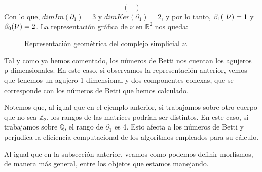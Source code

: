 \documentclass[12pt, a4paper]{article}
\numberwithin{equation}{section}
\theoremstyle{definition}
\newenvironment{ejem}
  {\pushQED{\qed}\renewcommand{\qedsymbol}{$\blacktriangleleft$}\ejemplo}
  {\popQED\endejemplo}
\theoremstyle{remark}
\theoremstyle{plain}
\begin{document}
\begin{ejem}
\begin{equation*}
\begin{pmatrix}
			\end{pmatrix}
		\end{equation*}
		Con lo que, $dimIm(\partial_{1})=3 \text{ y } 
		dimKer(\partial_{1})=2$, y por lo tanto, $\beta_{1}(\text{
		{\Large $\nu$}})=1$ y $\beta_{0}(\text{{\Large $\nu$}})=2$. La
		representación gráfica de {\Large $\nu$} en $\mathbb{R}^{2}$
		nos queda:
		\begin{figure}[H]
			\label{fig:homs}
			\centering
			\caption{Representación geométrica del complejo 
			simplicial {\Large $\nu$}.}
		\end{figure}
		Tal y como ya hemos comentado, los números de Betti nos 
		cuentan los agujeros p-dimensionales. En este caso, si 
		observamos la representación anterior, vemos que tenemos un 
		agujero 1-dimensional y dos componentes conexas, que se 
		corresponde con los números de Betti que hemos calculado. 

		Notemos que, al igual que en el ejemplo anterior, si 
		trabajamos sobre otro cuerpo que no sea $\mathbb{Z}_{2}$, los 
		rangos de las matrices podrían ser distintos. En este caso, si
		trabajamos sobre $\mathbb{Q}$, el rango de $\partial_{1}$ es 
		4. Esto afecta a los números de Betti y perjudica la 
		eficiencia computacional de los algoritmos empleados para su 
		cálculo.
	\end{ejem}
	
	Al igual que en la subsección anterior, veamos como podemos definir 
	morfismos, de manera más general, entre los objetos que estamos 
	manejando.
	
\end{document}
